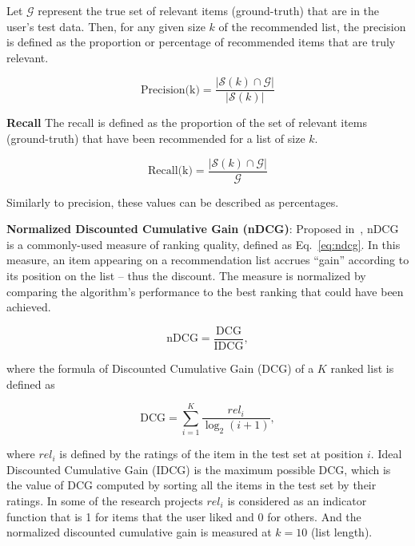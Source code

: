         Let $\mathcal{G}$ represent the true set of relevant items (ground-truth) that are in the user's test data. Then, for any given size $k$ of the recommended list, the precision is defined as the proportion or percentage of recommended items that are truly relevant. %
        
        \begin{equation}
        \text{Precision(k)}=\frac{|\mathcal{S}(k) \displaystyle \cap \mathcal{G}|}{|\mathcal{S}(k)|}
        \label{eq:precision}
        \end{equation}
        
        
        \textbf{Recall}
        The recall is defined as the proportion of the set of relevant items (ground-truth) that have been recommended for a list of size $k$.
        
        \begin{equation}
        \text{Recall(k)}=\frac{|\mathcal{S}(k) \displaystyle \cap \mathcal{G}|}{\mathcal{G}}
        \label{eq:recall}
        \end{equation}
        
        Similarly to precision, these values can be described as percentages.
        
        \textbf{Normalized Discounted Cumulative Gain (nDCG)}: Proposed in~\cite{jarvelin2002cumulated}, nDCG is a commonly-used measure of ranking quality, defined as Eq.~\eqref{eq:ndcg}. In this measure, an item appearing on a recommendation list accrues ``gain'' according to its position on the list -- thus the discount. The measure is normalized by comparing the algorithm's performance to the best ranking that could have been achieved. 

        \begin{equation}
        \text{nDCG}=\frac{\text{DCG}}{\text{IDCG}},
        \label{eq:ndcg}
        \end{equation}
        
        where the formula of Discounted Cumulative Gain (DCG) of a $K$ ranked list is defined as
        
        \begin{equation}
        \text{DCG}=\sum_{i=1}^K\frac{{rel}_i}{\log_2(i+1)},
        \end{equation}
        
        where ${rel}_i$ is defined by the ratings of the item in the test set at position $i$. Ideal Discounted Cumulative Gain (IDCG) is the maximum possible DCG, which is the value of DCG computed by sorting all the items in the test set by their ratings.
        In some of the research projects ${rel}_i$ is considered as an indicator function that is 1 for items that the user liked and 0 for others. And the normalized discounted cumulative gain is measured at $k=10$ (list length).
        
